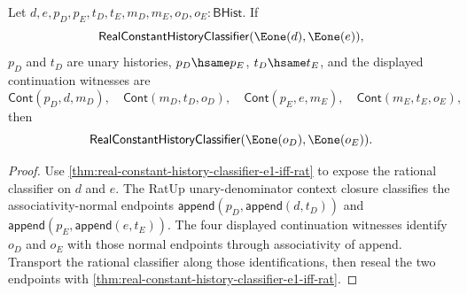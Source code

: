 \begin{theorem}
\label{thm:real-constant-history-classifier-cont-unary-denominator-context-closed}
Let $d,e,p_D,p_E,t_D,t_E,m_D,m_E,o_D,o_E:\mathsf{BHist}$. If
$$
\mathsf{RealConstantHistoryClassifier}(\Eone(d),\Eone(e)),
$$
$p_D$ and $t_D$ are unary histories, $p_D\hsame p_E$, $t_D\hsame t_E$, and the
displayed continuation witnesses are
$$
\mathsf{Cont}(p_D,d,m_D),\quad
\mathsf{Cont}(m_D,t_D,o_D),\quad
\mathsf{Cont}(p_E,e,m_E),\quad
\mathsf{Cont}(m_E,t_E,o_E),
$$
then
$$
\mathsf{RealConstantHistoryClassifier}(\Eone(o_D),\Eone(o_E)).
$$
\end{theorem}
\begin{proof}
Use \autoref{thm:real-constant-history-classifier-e1-iff-rat} to expose the
rational classifier on $d$ and $e$. The RatUp unary-denominator context closure
classifies the associativity-normal endpoints
$\mathsf{append}(p_D,\mathsf{append}(d,t_D))$ and
$\mathsf{append}(p_E,\mathsf{append}(e,t_E))$. The four displayed continuation
witnesses identify $o_D$ and $o_E$ with those normal endpoints through
associativity of append. Transport the rational classifier along those
identifications, then reseal the two endpoints with
\autoref{thm:real-constant-history-classifier-e1-iff-rat}.
\end{proof}

